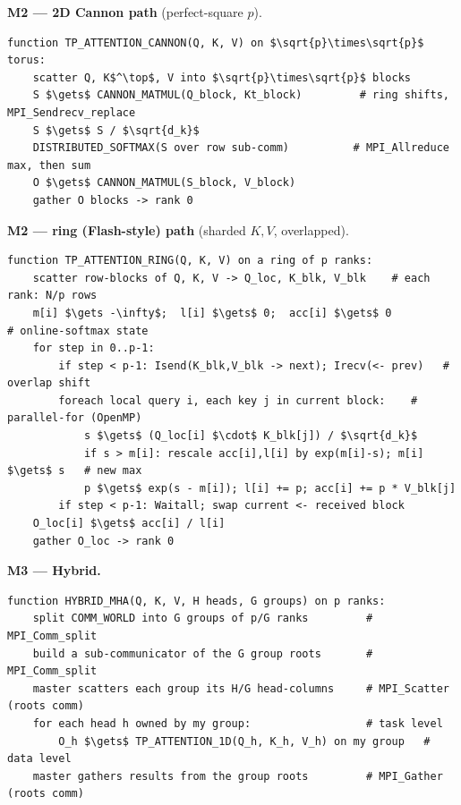 \documentclass[11pt,a4paper]{article}
\begin{document}
\noindent\textbf{M2 --- 2D Cannon path} (perfect-square $p$).
\begin{lstlisting}
function TP_ATTENTION_CANNON(Q, K, V) on $\sqrt{p}\times\sqrt{p}$ torus:
    scatter Q, K$^\top$, V into $\sqrt{p}\times\sqrt{p}$ blocks
    S $\gets$ CANNON_MATMUL(Q_block, Kt_block)         # ring shifts, MPI_Sendrecv_replace
    S $\gets$ S / $\sqrt{d_k}$
    DISTRIBUTED_SOFTMAX(S over row sub-comm)          # MPI_Allreduce max, then sum
    O $\gets$ CANNON_MATMUL(S_block, V_block)
    gather O blocks -> rank 0
\end{lstlisting}

\noindent\textbf{M2 --- ring (Flash-style) path} (sharded $K,V$, overlapped).
\begin{lstlisting}
function TP_ATTENTION_RING(Q, K, V) on a ring of p ranks:
    scatter row-blocks of Q, K, V -> Q_loc, K_blk, V_blk    # each rank: N/p rows
    m[i] $\gets -\infty$;  l[i] $\gets$ 0;  acc[i] $\gets$ 0          # online-softmax state
    for step in 0..p-1:
        if step < p-1: Isend(K_blk,V_blk -> next); Irecv(<- prev)   # overlap shift
        foreach local query i, each key j in current block:    # parallel-for (OpenMP)
            s $\gets$ (Q_loc[i] $\cdot$ K_blk[j]) / $\sqrt{d_k}$
            if s > m[i]: rescale acc[i],l[i] by exp(m[i]-s); m[i] $\gets$ s   # new max
            p $\gets$ exp(s - m[i]); l[i] += p; acc[i] += p * V_blk[j]
        if step < p-1: Waitall; swap current <- received block
    O_loc[i] $\gets$ acc[i] / l[i]
    gather O_loc -> rank 0
\end{lstlisting}

\noindent\textbf{M3 --- Hybrid.}
\begin{lstlisting}
function HYBRID_MHA(Q, K, V, H heads, G groups) on p ranks:
    split COMM_WORLD into G groups of p/G ranks         # MPI_Comm_split
    build a sub-communicator of the G group roots       # MPI_Comm_split
    master scatters each group its H/G head-columns     # MPI_Scatter (roots comm)
    for each head h owned by my group:                  # task level
        O_h $\gets$ TP_ATTENTION_1D(Q_h, K_h, V_h) on my group   # data level
    master gathers results from the group roots         # MPI_Gather (roots comm)
\end{lstlisting}

\end{document}
